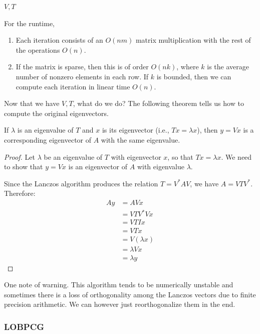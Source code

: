 \begin{algo}
\begin{algorithm}[H]
\begin{algorithmic}[1]
        \State \Return $V, T$
        \EndProcedure
      \end{algorithmic}
    \end{algorithm} 

    For the runtime, 
    \begin{enumerate}
      \item Each iteration consists of an $O(nm)$ matrix multiplication with the rest of the operations $O(n)$. 
      \item If the matrix is sparse, then this is of order $O(nk)$, where $k$ is the average number of nonzero elements in each row. If $k$ is bounded, then we can compute each iteration in linear time $O(n)$. 
    \end{enumerate}
  \end{algo} 

  Now that we have $V, T$, what do we do? The following theorem tells us how to compute the original eigenvectors.  

  \begin{theorem}
    If $\lambda$ is an eigenvalue of $T$ and $x$ is its eigenvector (i.e., $Tx = \lambda x$), then $y = Vx$ is a corresponding eigenvector of $A$ with the same eigenvalue.
  \end{theorem}
  \begin{proof}
    Let $\lambda$ be an eigenvalue of $T$ with eigenvector $x$, so that $Tx = \lambda x$. We need to show that $y = Vx$ is an eigenvector of $A$ with eigenvalue $\lambda$.

    Since the Lanczos algorithm produces the relation $T = V^* A V$, we have $A = VTV^*$. Therefore:
    \begin{align}
      Ay &= AVx \\
         &= VTV^* Vx \\
         &= VTIx \\
         &= VTx \\
         &= V(\lambda x) \\
         &= \lambda Vx \\
         &= \lambda y
    \end{align}
  \end{proof}

  One note of warning. This algorithm tends to be numerically unstable and sometimes there is a loss of orthogonality among the Lanczos vectors due to finite precision arithmetic. We can however just reorthogonalize them in the end. 

\subsubsection{LOBPCG}

